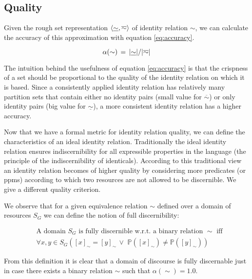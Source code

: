 \subsection{Quality}
\label{sec:quality}

Given the rough set representation $\langle\underline{\sim},\overline{\sim}\rangle$
  of identity relation $\sim$, we can calculate the accuracy of this
  approximation with equation \ref{eq:accuracy}.

\small
\begin{equation}
\label{eq:accuracy}
  \alpha(\sim)
\,=\,
  \lvert\underline{\sim}\rvert / {\lvert\overline{\sim}\rvert}
\end{equation}
\normalsize

The intuition behind the usefulness of equation \ref{eq:accuracy}
  is that the crispness of a set should be proportional to the quality
  of the identity relation on which it is based.
Since a consistently applied identity relation has relatively many
  partition sets that contain either
  no identity pairs (small value for $\overline{\sim}$) or
  only identity pairs (big value for $\underline{\sim}$),
  a more consistent identity relation has a higher accuracy.

Now that we have a formal metric for identity relation quality,
  we can define the characteristics of an ideal identity relation.
Traditionally the ideal identity relation ensures indiscernibility
  for all expressible properties in the language
  (the principle of the indiscernibility of identicals).
According to this traditional view an identity relation becomes of
  higher quality by considering more predicates (or ppms)
  according to which two resources are not allowed to be discernible.
We give a different quality criterion.

We observe that for a given equivalence relation $\sim$
  defined over a domain of resources $S_G$ we can define the notion of
  full discernibility:

\small
\begin{definition}
\label{def:fully_discernible}
\begin{align}
& \text{A domain $S_G$ is fully discernible w.r.t. a binary relation $\sim$ iff}
\nonumber
\\
 & \forall x,y \in S_G (
    [x]_{\sim}=[y]_{\sim}
  \,\lor\,\,
    \mathbb{P}([x]_{\sim}) \neq \mathbb{P}([y]_{\sim})
  )
\end{align}
\end{definition}
\normalsize

\noindent From this definition it is clear that a domain of discourse
  is fully discernable just in case there exists a binary relation $\sim$
  such that \mbox{$\alpha(\sim) = 1.0$}.
